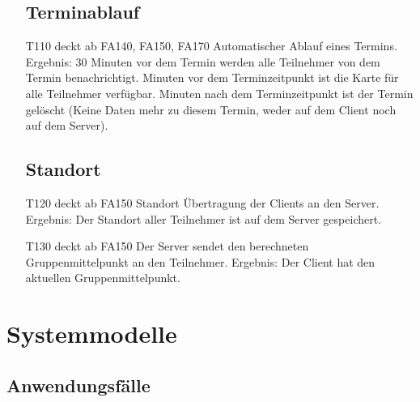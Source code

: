\documentclass{scrartcl}
\begin{document}
\begin{itemize}
	\subsection{Terminablauf}
	
		\item[T110] deckt ab FA140, FA150, FA170 \newline
		Automatischer Ablauf eines Termins. \newline
		Ergebnis: 30 Minuten vor dem Termin werden alle \gls{Teilnehmer} von dem Termin benachrichtigt.   Minuten vor dem Terminzeitpunkt ist die Karte für alle Teilnehmer verfügbar.   Minuten nach dem Terminzeitpunkt ist der Termin gelöscht (Keine Daten mehr zu diesem Termin, weder auf 					dem \gls{Client} noch auf dem \gls{Server}).

	\subsection{Standort}
		\item[T120] deckt ab FA150 \newline
		Standort Übertragung der Clients an den \gls{Server}.  \newline
		Ergebnis: Der Standort aller \gls{Teilnehmer} ist auf dem Server gespeichert.

		\item[T130]  deckt ab FA150 \newline
		Der Server sendet den berechneten Gruppenmittelpunkt an den \gls{Teilnehmer}. \newline
		Ergebnis: Der Client hat den aktuellen Gruppenmittelpunkt.

	\end{itemize}	
	
	\newpage
	
	
	\section{Systemmodelle}
	
	\subsection{Anwendungsfälle}
\end{document}
